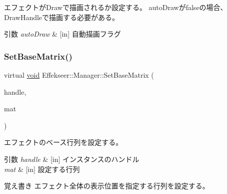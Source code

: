 エフェクトが\+Drawで描画されるか設定する。 auto\+Drawがfalseの場合、\+Draw\+Handleで描画する必要がある。 


\begin{DoxyParams}{引数}
{\em auto\+Draw} & \mbox{[}in\mbox{]} 自動描画フラグ \\
\hline
\end{DoxyParams}
\mbox{\label{class_effekseer_1_1_manager_a0f94ad0b6cd362283bc216515a89822c}} 
\subsubsection{\texorpdfstring{Set\+Base\+Matrix()}{SetBaseMatrix()}}
{\footnotesize\ttfamily virtual \mbox{\hyperlink{namespace_effekseer_ab34c4088e512200cf4c2716f168deb56}{void}} Effekseer\+::\+Manager\+::\+Set\+Base\+Matrix (\begin{DoxyParamCaption}\item[{\mbox{\hyperlink{namespace_effekseer_afba58b8d812da862190e9bbfc040824a}{Handle}}}]{handle,  }\item[{const \mbox{\hyperlink{struct_effekseer_1_1_matrix43}{Matrix43}} \&}]{mat }\end{DoxyParamCaption})\hspace{0.3cm}{\ttfamily [pure virtual]}}



エフェクトのベース行列を設定する。 


\begin{DoxyParams}{引数}
{\em handle} & \mbox{[}in\mbox{]} インスタンスのハンドル \\
\hline
{\em mat} & \mbox{[}in\mbox{]} 設定する行列 \\
\hline
\end{DoxyParams}
\begin{DoxyNote}{覚え書き}
エフェクト全体の表示位置を指定する行列を設定する。 
\end{DoxyNote}
\mbox{\label{class_effekseer_1_1_manager_a804730036eada2d3e1883ed366c265cc}} 
